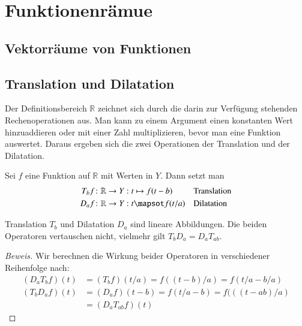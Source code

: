 %
%
%
\section{Funktionenrämue
\label{section:funktionenraume}}

\subsection{Vektorräume von Funktionen}

\subsection{Translation und Dilatation}
Der Definitionsbereich $\mathbb R$ zeichnet sich durch die darin zur
Verfügung stehenden Rechenoperationen aus.
Man kann zu einem Argument einen konstanten Wert hinzuaddieren oder mit
einer Zahl multiplizieren, bevor man eine Funktion auswertet.
Daraus ergeben sich die zwei Operationen der Translation und der Dilatation.

\begin{definition}
Sei $f$ eine Funktion auf $\mathbb R$ mit Werten in $Y$.
Dann setzt man
\begin{align*}
T_bf&\colon \mathbb R \to Y: t\mapsto f(t-b)&&\text{Translation}
\\
D_af&\colon \mathbb R \to Y: t\mapsot f(t/a)&&\text{Dilatation}
\end{align*}
\end{definition}



\begin{satz}
Translation $T_b$ und Dilatation $D_a$ sind lineare Abbildungen.
Die beiden Operatoren vertauschen nicht, vielmehr gilt
$T_bD_a = D_aT_{ab}$.
\end{satz}

\begin{proof}[Beweis]

Wir berechnen die Wirkung beider Operatoren in verschiedener Reihenfolge
nach:
\begin{align*}
(D_aT_bf)(t)
&=
(T_bf)(t/a)
=
f((t-b)/a) = f(t/a - b/a)
\\
(T_bD_a f)(t)
&=
(D_af)(t - b)
=
f(t/a - b)
=
f(((t-ab)/a)
\\
&=
(D_aT_{ab}f)(t)
\end{align*}
\end{proof}

